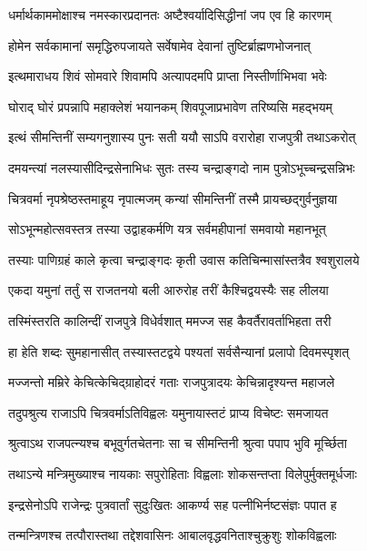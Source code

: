 \begin{center}
\twolineshloka
{धर्मार्थकाममोक्षाश्च नमस्कारप्रदानतः}
{अष्टैश्वर्यादिसिद्धीनां जप एव हि कारणम्} %

\twolineshloka
{होमेन सर्वकामानां समृद्धिरुपजायते}
{सर्वेषामेव देवानां तुष्टिर्ब्राह्मणभोजनात्} %

\twolineshloka
{इत्थमाराधय शिवं सोमवारे शिवामपि}
{अत्यापदमपि प्राप्ता निस्तीर्णाभिभवा भवेः} %

\twolineshloka
{घोराद् घोरं प्रपन्नापि महाक्लेशं भयानकम्}
{शिवपूजाप्रभावेण तरिष्यसि महद्भयम्} %

\twolineshloka
{इत्थं सीमन्तिनीं सम्यगनुशास्य पुनः सती}
{ययौ साऽपि वरारोहा राजपुत्री तथाऽकरोत्} %

\twolineshloka
{दमयन्त्यां नलस्यासीदिन्द्रसेनाभिधः सुतः}
{तस्य चन्द्राङ्गदो नाम पुत्रोऽभूच्चन्द्रसन्निभः} %

\twolineshloka
{चित्रवर्मा नृपश्रेष्ठस्तमाहूय नृपात्मजम्}
{कन्यां सीमन्तिनीं तस्मै प्रायच्छद्गुर्वनुज्ञया} %

\twolineshloka
{सोऽभून्महोत्सवस्तत्र तस्या उद्वाहकर्मणि}
{यत्र सर्वमहीपानां समवायो महानभूत्} %

\twolineshloka
{तस्याः पाणिग्रहं काले कृत्वा चन्द्राङ्गदः कृती}
{उवास कतिचिन्मासांस्तत्रैव श्वशुरालये} %

\twolineshloka
{एकदा यमुनां तर्तुं स राजतनयो बली}
{आरुरोह तरीं कैश्चिद्वयस्यैः सह लीलया} %

\twolineshloka
{तस्मिंस्तरति कालिन्दीं राजपुत्रे विधेर्वशात्}
{ममज्ज सह कैवर्तैरावर्ताभिहता तरी} %

\twolineshloka
{हा हेति शब्दः सुमहानासीत् तस्यास्तटद्वये}
{पश्यतां सर्वसैन्यानां प्रलापो दिवमस्पृशत्} %

\twolineshloka
{मज्जन्तो मम्रिरे केचित्केचिद्ग्राहोदरं गताः}
{राजपुत्रादयः केचिन्नादृश्यन्त महाजले} %

\twolineshloka
{तदुपश्रुत्य राजाऽपि चित्रवर्माऽतिविह्वलः}
{यमुनायास्तटं प्राप्य विचेष्टः समजायत} %

\twolineshloka
{श्रुत्वाऽथ राजपत्न्यश्च बभूवुर्गतचेतनाः}
{सा च सीमन्तिनी श्रुत्वा पपाप भुवि मूर्च्छिता} %

\twolineshloka
{तथाऽन्ये मन्त्रिमुख्याश्च नायकाः सपुरोहिताः}
{विह्वलाः शोकसन्तप्ता विलेपुर्मुक्तमूर्धजाः} %

\twolineshloka
{इन्द्रसेनोऽपि राजेन्द्रः पुत्रवार्तां सुदुःखितः}
{आकर्ण्य सह पत्नीभिर्नष्टसंज्ञः पपात ह} %

\twolineshloka
{तन्मन्त्रिणश्च तत्पौरास्तथा तद्देशवासिनः}
{आबालवृद्धवनिताश्चुक्रुशुः शोकविह्वलाः} %


\end{center}
